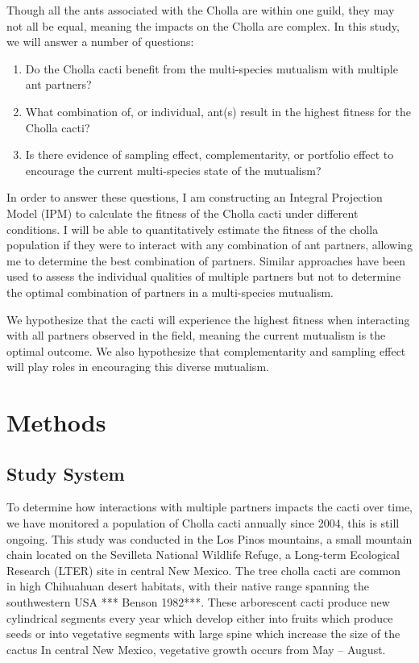 \documentclass[12pt,a4paper]{article}
\begin{document}
Though all the ants associated with the Cholla are within one guild, they may not all be equal, meaning the impacts on the Cholla are complex. In this study, we will answer a number of questions: 
\begin{enumerate}
	\item Do the Cholla cacti benefit from the multi-species mutualism with multiple ant partners?
	\item What combination of, or individual, ant(s) result in the highest fitness for the Cholla cacti?
	\item Is there evidence of sampling effect, complementarity, or portfolio effect to encourage the current multi-species state of the mutualism?
\end{enumerate}

In order to answer these questions, I am constructing an Integral Projection Model (IPM) to calculate the fitness of the Cholla cacti under different conditions. I will be able to quantitatively estimate the fitness of the cholla population if they were to interact with any combination of ant partners, allowing me to determine the best combination of partners. Similar approaches have been used to assess the individual qualities of multiple partners\cite{Palmer2010} but not to determine the optimal combination of partners in a multi-species mutualism. 

We hypothesize that the cacti will experience the highest fitness when interacting with all partners observed in the field, meaning the current mutualism is the optimal outcome. We also hypothesize that complementarity and sampling effect will play roles in encouraging this diverse mutualism. 	

\section*{Methods}
\subsection*{Study System}

To determine how interactions with multiple partners impacts the cacti over time, we have monitored a population of Cholla cacti annually since 2004, this is still ongoing. This study was conducted in the Los Pinos mountains, a small mountain chain located on the Sevilleta National Wildlife Refuge, a Long-term Ecological Research (LTER) site in central New Mexico. The tree cholla cacti are common in high Chihuahuan desert habitats, with their native range spanning the southwestern USA *** Benson 1982***. These arborescent cacti produce new cylindrical segments every year which develop either into fruits which produce seeds or into vegetative segments with large spine which increase the size of the cactus %
In central New Mexico, vegetative growth occurs from May -- August.
\end{document}

